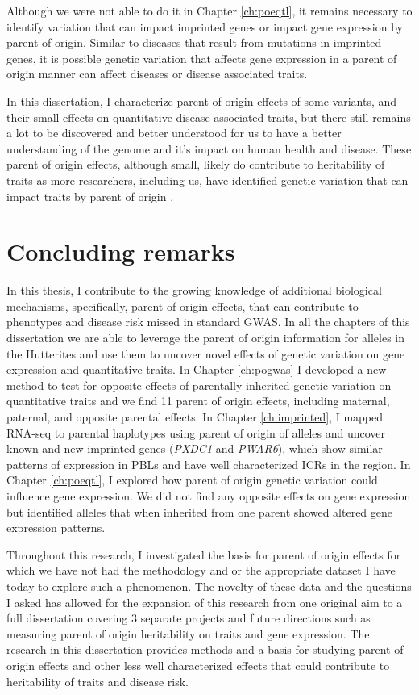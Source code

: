 Although we were not able to do it in Chapter \ref{ch:poeqtl}, it remains necessary to identify variation that can impact imprinted genes or impact gene expression by parent of origin. Similar to diseases that result from mutations in imprinted genes, it is possible genetic variation that affects gene expression in a parent of origin manner can affect diseases or disease associated traits. 

In this dissertation, I characterize parent of origin effects of some variants, and their small effects on quantitative disease associated traits, but there still remains a lot to be discovered and better understood for us to have a better understanding of the genome and it's impact on human health and disease. These parent of origin effects, although small, likely do contribute to heritability of traits as more researchers, including us, have identified genetic variation that can impact traits by parent of origin \cite{Benonisdottir:2016dz,Zoledziewska:2015do,Garg2012a,Kong:2009kk}. 


\section{Concluding remarks}

In this thesis, I contribute to the growing knowledge of additional biological mechanisms, specifically, parent of origin effects, that can contribute to phenotypes and disease risk missed in standard GWAS. In all the chapters of this dissertation we are able to leverage the parent of origin information for alleles in the Hutterites and use them to uncover novel effects of genetic variation on gene expression and quantitative traits. In Chapter \ref{ch:pogwas} I developed a new method to test for opposite effects of parentally inherited genetic variation on quantitative traits and we find 11 parent of origin effects, including maternal, paternal, and opposite parental effects. In Chapter \ref{ch:imprinted}, I mapped RNA-seq to parental haplotypes using parent of origin of alleles and uncover known and new imprinted genes (\emph{PXDC1} and \emph{PWAR6}), which show similar patterns of expression in PBLs and have well characterized ICRs in the region. In Chapter \ref{ch:poeqtl}, I explored how parent of origin genetic variation could influence gene expression. We did not find any opposite effects on gene expression but identified alleles that when inherited from one parent showed altered gene expression patterns. 

Throughout this research, I investigated the basis for parent of origin effects for which we have not had the methodology and or the appropriate dataset I have today to explore such a phenomenon. The novelty of these data and the questions I asked  has allowed for the expansion of this research from one original aim to a full dissertation covering 3 separate projects and future directions such as measuring parent of origin heritability on traits and gene expression. The research in this dissertation provides methods and a basis for studying parent of origin effects and other less well characterized effects that could contribute to heritability of traits and disease risk. 




